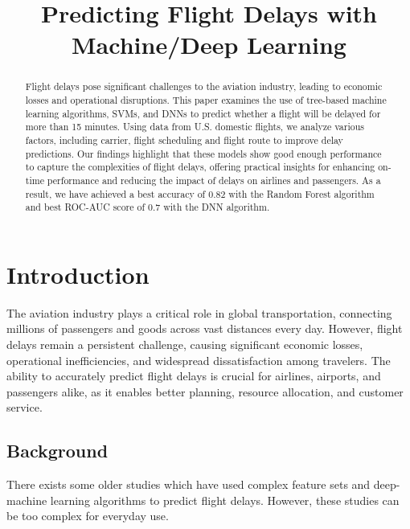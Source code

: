 \documentclass[conference]{IEEEtran}
\begin{document}
\title{Predicting Flight Delays with Machine/Deep Learning}

\author{
}

\maketitle

\begin{abstract}
Flight delays pose significant challenges to the aviation industry, leading to economic losses and operational disruptions. This paper examines the use of tree-based machine learning algorithms, SVMs, and DNNs to predict whether a flight will be delayed for more than 15 minutes. Using data from U.S. domestic flights, we analyze various factors, including carrier, flight scheduling and flight route to improve delay predictions. Our findings highlight that these models show good enough performance to capture the complexities of flight delays, offering practical insights for enhancing on-time performance and reducing the impact of delays on airlines and passengers. As a result, we have achieved a best accuracy of 0.82 with the Random Forest algorithm and best ROC-AUC score of 0.7 with the DNN algorithm.

\end{abstract}

\section{Introduction}
The aviation industry plays a critical role in global transportation, connecting millions of passengers and goods across vast distances every day. However, flight delays remain a persistent challenge, causing significant economic losses, operational inefficiencies, and widespread dissatisfaction among travelers. The ability to accurately predict flight delays is crucial for airlines, airports, and passengers alike, as it enables better planning, resource allocation, and customer service.

\subsection{Background}
There exists some older studies which have used complex feature sets and deep-machine learning algorithms to predict flight delays. However, these studies can be too complex for everyday use.
\end{document}
